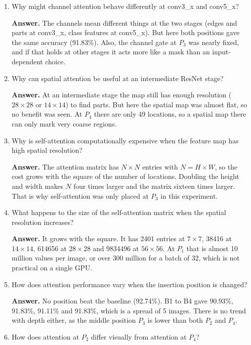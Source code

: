 \documentclass[10pt]{article}
\begin{document}
\begin{enumerate}
\item Why might channel attention behave differently at conv3\_x and conv5\_x?

\textbf{Answer.} The channels mean different things at the two stages (edges and parts at conv3\_x, class features at conv5\_x). But here both positions gave the same accuracy (91.83\%). Also, the channel gate at $P_3$ was nearly fixed, and if that holds at other stages it acts more like a mask than an input-dependent choice.

\item Why can spatial attention be useful at an intermediate ResNet stage?

\textbf{Answer.} At an intermediate stage the map still has enough resolution ($28\times28$ or $14\times14$) to find parts. But here the spatial map was almost flat, so no benefit was seen. At $P_4$ there are only 49 locations, so a spatial map there can only mark very coarse regions.

\item Why is self-attention computationally expensive when the feature map has high spatial resolution?

\textbf{Answer.} The attention matrix has $N\times N$ entries with $N=H\times W$, so the cost grows with the square of the number of locations. Doubling the height and width makes $N$ four times larger and the matrix sixteen times larger. That is why self-attention was only placed at $P_3$ in this experiment.

\item What happens to the size of the self-attention matrix when the spatial resolution increases?

\textbf{Answer.} It grows with the square. It has 2401 entries at $7\times7$, 38416 at $14\times14$, 614656 at $28\times28$ and 9834496 at $56\times56$. At $P_1$ that is almost 10 million values per image, or over 300 million for a batch of 32, which is not practical on a single GPU.

\item How does attention performance vary when the insertion position is changed?

\textbf{Answer.} No position beat the baseline (92.74\%). B1 to B4 gave 90.93\%, 91.83\%, 91.11\% and 91.83\%, which is a spread of 5 images. There is no trend with depth either, as the middle position $P_3$ is lower than both $P_2$ and $P_4$.

\item How does attention at $P_2$ differ visually from attention at $P_4$?


\end{enumerate}
\end{document}
